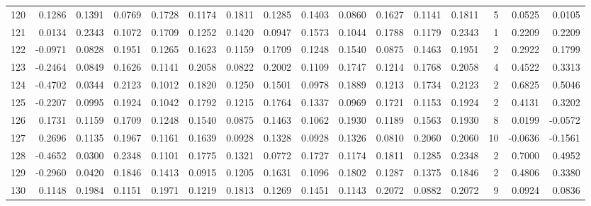 \begin{tabular}{lrrrrrrrrrrrrrrr}
120 &      0.1286 &  0.1391 &  0.0769 &  0.1728 &  0.1174 &  0.1811 &  0.1285 &  0.1403 &  0.0860 &  0.1627 &   0.1141 &     0.1811 &      5 &                    0.0525 &                     0.0105 \\
121 &      0.0134 &  0.2343 &  0.1072 &  0.1709 &  0.1252 &  0.1420 &  0.0947 &  0.1573 &  0.1044 &  0.1788 &   0.1179 &     0.2343 &      1 &                    0.2209 &                     0.2209 \\
122 &     -0.0971 &  0.0828 &  0.1951 &  0.1265 &  0.1623 &  0.1159 &  0.1709 &  0.1248 &  0.1540 &  0.0875 &   0.1463 &     0.1951 &      2 &                    0.2922 &                     0.1799 \\
123 &     -0.2464 &  0.0849 &  0.1626 &  0.1141 &  0.2058 &  0.0822 &  0.2002 &  0.1109 &  0.1747 &  0.1214 &   0.1768 &     0.2058 &      4 &                    0.4522 &                     0.3313 \\
124 &     -0.4702 &  0.0344 &  0.2123 &  0.1012 &  0.1820 &  0.1250 &  0.1501 &  0.0978 &  0.1889 &  0.1213 &   0.1734 &     0.2123 &      2 &                    0.6825 &                     0.5046 \\
125 &     -0.2207 &  0.0995 &  0.1924 &  0.1042 &  0.1792 &  0.1215 &  0.1764 &  0.1337 &  0.0969 &  0.1721 &   0.1153 &     0.1924 &      2 &                    0.4131 &                     0.3202 \\
126 &      0.1731 &  0.1159 &  0.1709 &  0.1248 &  0.1540 &  0.0875 &  0.1463 &  0.1062 &  0.1930 &  0.1189 &   0.1563 &     0.1930 &      8 &                    0.0199 &                    -0.0572 \\
127 &      0.2696 &  0.1135 &  0.1967 &  0.1161 &  0.1639 &  0.0928 &  0.1328 &  0.0928 &  0.1326 &  0.0810 &   0.2060 &     0.2060 &     10 &                   -0.0636 &                    -0.1561 \\
128 &     -0.4652 &  0.0300 &  0.2348 &  0.1101 &  0.1775 &  0.1321 &  0.0772 &  0.1727 &  0.1174 &  0.1811 &   0.1285 &     0.2348 &      2 &                    0.7000 &                     0.4952 \\
129 &     -0.2960 &  0.0420 &  0.1846 &  0.1413 &  0.0915 &  0.1205 &  0.1631 &  0.1096 &  0.1802 &  0.1287 &   0.1375 &     0.1846 &      2 &                    0.4806 &                     0.3380 \\
130 &      0.1148 &  0.1984 &  0.1151 &  0.1971 &  0.1219 &  0.1813 &  0.1269 &  0.1451 &  0.1143 &  0.2072 &   0.0882 &     0.2072 &      9 &                    0.0924 &                     0.0836 \\

\end{tabular}
